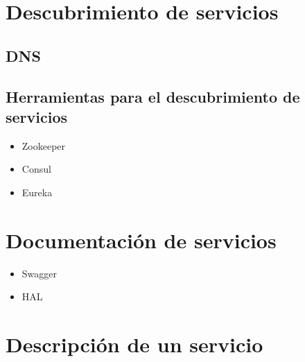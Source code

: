 \documentclass[11pt,a4paper]{article}
\begin{document}
\section{Descubrimiento de servicios}

\subsection{DNS}

\subsection{Herramientas para el descubrimiento de servicios}

\begin{itemize}
\item Zookeeper
\item Consul
\item Eureka
\end{itemize}

\section{Documentación de servicios}

\begin{itemize}
\item Swagger
\item HAL
\end{itemize}

\section{Descripción de un servicio}
\end{document}
